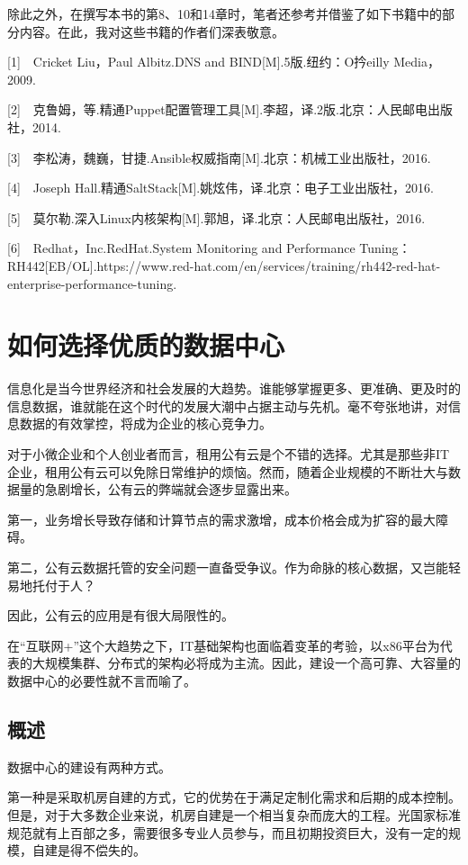 \documentclass[12pt,UTF8]{ctexbook}
\begin{document}
除此之外，在撰写本书的第8、10和14章时，笔者还参考并借鉴了如下书籍中的部分内容。在此，我对这些书籍的作者们深表敬意。

[1]　Cricket Liu，Paul Albitz.DNS and BIND[M].5版.纽约：O扲eilly Media，2009.

[2]　克鲁姆，等.精通Puppet配置管理工具[M].李超，译.2版.北京：人民邮电出版社，2014.

[3]　李松涛，魏巍，甘捷.Ansible权威指南[M].北京：机械工业出版社，2016.

[4]　Joseph Hall.精通SaltStack[M].姚炫伟，译.北京：电子工业出版社，2016.

[5]　莫尔勒.深入Linux内核架构[M].郭旭，译.北京：人民邮电出版社，2016.

[6]　Redhat，Inc.RedHat.System Monitoring and Performance Tuning：RH442[EB/OL].https://www.red-hat.com/en/services/training/rh442-red-hat-enterprise-performance-tuning.

\chapter{如何选择优质的数据中心}

信息化是当今世界经济和社会发展的大趋势。谁能够掌握更多、更准确、更及时的信息数据，谁就能在这个时代的发展大潮中占据主动与先机。毫不夸张地讲，对信息数据的有效掌控，将成为企业的核心竞争力。

对于小微企业和个人创业者而言，租用公有云是个不错的选择。尤其是那些非IT企业，租用公有云可以免除日常维护的烦恼。然而，随着企业规模的不断壮大与数据量的急剧增长，公有云的弊端就会逐步显露出来。

第一，业务增长导致存储和计算节点的需求激增，成本价格会成为扩容的最大障碍。

第二，公有云数据托管的安全问题一直备受争议。作为命脉的核心数据，又岂能轻易地托付于人？

因此，公有云的应用是有很大局限性的。

在“互联网+”这个大趋势之下，IT基础架构也面临着变革的考验，以x86平台为代表的大规模集群、分布式的架构必将成为主流。因此，建设一个高可靠、大容量的数据中心的必要性就不言而喻了。

\section{概述}

数据中心的建设有两种方式。

第一种是采取机房自建的方式，它的优势在于满足定制化需求和后期的成本控制。但是，对于大多数企业来说，机房自建是一个相当复杂而庞大的工程。光国家标准规范就有上百部之多，需要很多专业人员参与，而且初期投资巨大，没有一定的规模，自建是得不偿失的。
\end{document}
